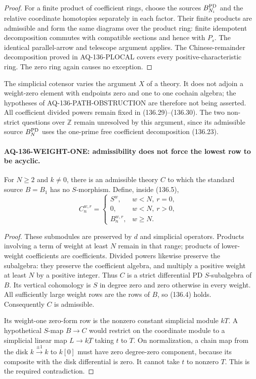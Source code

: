 \begin{proof}
For a finite product of coefficient rings, choose the
sources $B_{N_i}^{\rm PD}$ and the relative coordinate
homotopies separately in each factor.  Their finite
products are admissible and form the same diagrams over
the product ring: finite idempotent decomposition
commutes with compatible sections and hence with
$P_s$.  The identical parallel-arrow and telescope
argument applies.  The Chinese-remainder decomposition
proved in AQ-136-PLOCAL covers every positive-characteristic
ring.  The zero ring again causes no exception.
\end{proof}

The simplicial cotensor varies the argument $X$ of a
theory.  It does not adjoin a weight-zero element with
endpoints zero and one to one cochain algebra; the
hypotheses of AQ-136-PATH-OBSTRUCTION are therefore
not being asserted.  All coefficient divided powers
remain fixed in (136.29)--(136.30).
The two non-strict questions over $\mathbb Z$ remain
unresolved by this argument, since its admissible
source $B_N^{\rm PD}$ uses the one-prime free coefficient
decomposition (136.23).

\paragraph{AQ-136-WEIGHT-ONE: admissibility does not force the lowest row to be acyclic.}
For $N\geq2$ and $k\ne0$, there is an admissible theory
$C$ to which the standard source $B=B_1$ has no
$S$-morphism.  Define, inside (136.5),
\[
 C^{w,r}_n=
 \begin{cases}
 S^w,&w<N,\ r=0,\\
 0,&w<N,\ r>0,\\
 B^{w,r}_n,&w\geq N.
 \end{cases}                                               \tag{136.31}
\]

\begin{proof}
These submodules are preserved by $d$ and simplicial
operators.  Products involving a term of weight at
least $N$ remain in that range; products of lower-weight
coefficients are coefficients.  Divided powers likewise
preserve the subalgebra: they preserve the coefficient
algebra, and multiply a positive weight at least $N$
by a positive integer.  Thus $C$ is a strict differential
PD $S$-subalgebra of $B$.
Its vertical cohomology is $S$ in degree zero and zero
otherwise in every weight.  All sufficiently large
weight rows are the rows of $B$, so (136.4) holds.
Consequently $C$ is admissible.

Its weight-one zero-form row is the nonzero constant
simplicial module $kT$.  A hypothetical $S$-map
$B\to C$ would restrict on the coordinate module to
a simplicial linear map $L\to\underline{kT}$ taking
$t$ to $T$.  On normalization, a chain map from the
disk $k\xrightarrow{\pm1}k$ to $k[0]$ must have zero
degree-zero component, because its composite with
the disk differential is zero.  It cannot take $t$
to nonzero $T$.  This is the required contradiction.
\end{proof}


